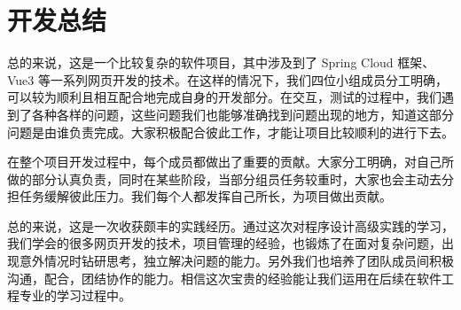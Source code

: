 \section{开发总结}
总的来说，这是一个比较复杂的软件项目，其中涉及到了 Spring Cloud 框架、Vue3 等一系列网页开发的技术。在这样的情况下，我们四位小组成员分工明确，可以较为顺利且相互配合地完成自身的开发部分。在交互，测试的过程中，我们遇到了各种各样的问题，这些问题我们也能够准确找到问题出现的地方，知道这部分问题是由谁负责完成。大家积极配合彼此工作，才能让项目比较顺利的进行下去。

在整个项目开发过程中，每个成员都做出了重要的贡献。大家分工明确，对自己所做的部分认真负责，同时在某些阶段，当部分组员任务较重时，大家也会主动去分担任务缓解彼此压力。我们每个人都发挥自己所长，为项目做出贡献。

总的来说，这是一次收获颇丰的实践经历。通过这次对程序设计高级实践的学习，我们学会的很多网页开发的技术，项目管理的经验，也锻炼了在面对复杂问题，出现意外情况时钻研思考，独立解决问题的能力。另外我们也培养了团队成员间积极沟通，配合，团结协作的能力。相信这次宝贵的经验能让我们运用在后续在软件工程专业的学习过程中。


